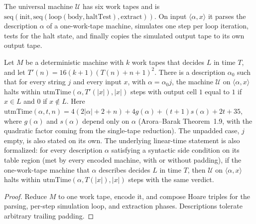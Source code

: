 \begin{definition}
  \label{def:models-utm}
  \leanok
  The universal machine $\mathcal{U}$ has six work tapes and is
  $\mathrm{seq}(\mathrm{init}, \mathrm{seq}(\mathrm{loop}(\mathrm{body},
  \mathrm{haltTest}), \mathrm{extract}))$. On input $\langle \alpha, x \rangle$
  it parses the description $\alpha$ of a one-work-tape machine, simulates one
  step per loop iteration, tests for the halt state, and finally copies the
  simulated output tape to its own output tape.
\end{definition}

\begin{theorem}
  \label{thm:models-utm-deciders}
  \leanok
  Let $M$ be a deterministic machine with $k$ work tapes that decides $L$ in
  time $T$, and let $T'(n) = 16(k+1)(T(n) + n + 1)^2$. There is a description
  $\alpha_0$ such that for every string $j$ and every input $x$, with
  $\alpha = \alpha_0 j$, the machine $\mathcal{U}$ on
  $\langle \alpha, x \rangle$ halts within
  $\mathrm{utmTime}(\alpha, T'(|x|), |x|)$ steps with output cell $1$ equal to
  $1$ if $x \in L$ and $0$ if $x \notin L$. Here
  $\mathrm{utmTime}(\alpha, t, n) = 4(2|\alpha| + 2 + n) + 4 g(\alpha) +
  (t+1) s(\alpha) + 2t + 35$, where $g(\alpha)$ and $s(\alpha)$ depend only on
  $\alpha$ (Arora--Barak Theorem~1.9, with the quadratic factor coming from the
  single-tape reduction). The unpadded case, $j$ empty, is also stated on its
  own. The underlying linear-time statement is also formalized: for every
  description $\alpha$ satisfying a syntactic side condition on its table
  region (met by every encoded machine, with or without padding), if the
  one-work-tape machine that $\alpha$ describes decides $L$ in time $T$, then
  $\mathcal{U}$ on $\langle \alpha, x \rangle$ halts within
  $\mathrm{utmTime}(\alpha, T(|x|), |x|)$ steps with the same verdict.
\end{theorem}
\begin{proof}
  \leanok
  Reduce $M$ to one work tape, encode it, and compose Hoare triples for the
  parsing, per-step simulation loop, and extraction phases. Descriptions
  tolerate arbitrary trailing padding.
\end{proof}


